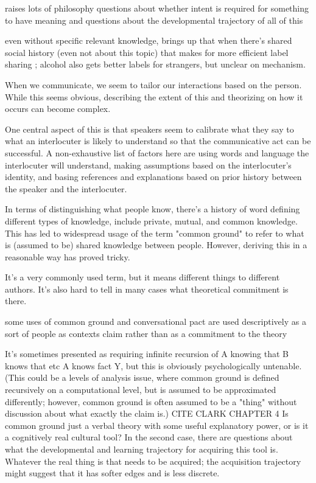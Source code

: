 \documentclass[]{article}
\begin{document}
raises lots of philosophy questions about whether intent is required for something to have meaning and questions about the developmental trajectory of all of this 

even without specific relevant knowledge, \cite{garrison2022} brings up that when there's shared social history (even not about this topic) that makes for more efficient label sharing ; alcohol also gets better labels for strangers, but unclear on mechanism. 


When we communicate, we seem to tailor our interactions based on the person. While this seems obvious, describing the extent of this and theorizing on how it occurs can become complex. 

One central aspect of this is that speakers seem to calibrate what they say to what an interlocuter is likely to understand so that the communicative act can be successful. A non-exhaustive list of factors here are using words and language the interlocuter will understand, making assumptions based on the interlocuter's identity, and basing references and explanations based on prior history between the speaker and the interlocuter. 

In terms of distinguishing what people know, there's a history of word defining different types of knowledge, include private, mutual, and common knowledge. This has led to widespread usage of the term "common ground" to refer to what is (assumed to be) shared knowledge between people. However, deriving this in a reasonable way has proved tricky.

It's a very commonly used term, but it means different things to different authors. It's also hard to tell in many cases what theoretical commitment is there. 

some uses of common ground and conversational pact are used descriptively as a sort of people as contexts claim \cite{leung2023} rather than as a commitment to the theory 

 It's sometimes presented as requiring infinite recursion of A knowing that B knows that etc A knows fact Y, but this is obviously psychologically untenable. (This could be a levels of analysis issue, where common ground is defined recursively on a computational level, but is assumed to be approximated differently; however, common ground is often assumed to be a "thing" without discussion about what exactly the claim is.) CITE CLARK CHAPTER 4 Is common ground just a verbal theory with some useful explanatory power, or is it a cognitively real cultural tool? In the second case, there are questions about what the developmental and learning trajectory for acquiring this tool is. Whatever the real thing is that needs to be acquired; the acquisition trajectory might suggest that it has softer edges and is less discrete. 
\end{document}
